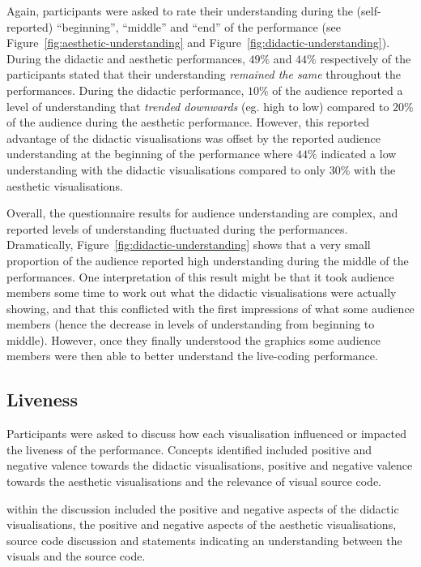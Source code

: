 Again, participants were asked to rate their understanding during the
(self-reported) ``beginning'', ``middle'' and ``end'' of the
performance (see Figure~\ref{fig:aesthetic-understanding} and
Figure~\ref{fig:didactic-understanding}). During the didactic and
aesthetic performances, $49\%$ and $44\%$ respectively of the
participants stated that their understanding \emph{remained the same}
throughout the performances. During the didactic performance, $10\%$
of the audience reported a level of understanding that \emph{trended
  downwards} (eg. high to low) compared to $20\%$ of the audience
during the aesthetic performance. However, this reported advantage of
the didactic visualisations was offset by the reported audience
understanding at the beginning of the performance where $44\%$
indicated a low understanding with the didactic visualisations
compared to only $30\%$ with the aesthetic visualisations. 

Overall, the questionnaire results for audience understanding are
complex, and reported levels of understanding fluctuated during the
performances. Dramatically, Figure~\ref{fig:didactic-understanding}
shows that a very small proportion of the audience reported high
understanding during the middle of the performances. One
interpretation of this result might be that it took audience members
some time to work out what the didactic visualisations were actually
showing, and that this conflicted with the first impressions of what
some audience members (hence the decrease in levels of understanding
from beginning to middle). However, once they finally understood the
graphics some audience members were then able to better understand the
live-coding performance.


\subsection{Liveness}

Participants were asked to discuss how each visualisation influenced or impacted the liveness of the performance. Concepts identified included positive and negative valence towards the didactic visualisations, positive and negative valence towards the aesthetic visualisations and the relevance of visual source code. 

within the discussion included the positive and negative aspects of the didactic visualisations, the positive and negative aspects of the aesthetic visualisations, source code discussion and statements indicating an understanding between the visuals and the source code.

